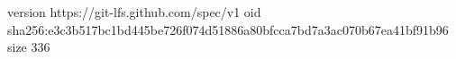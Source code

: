 version https://git-lfs.github.com/spec/v1
oid sha256:e3c3b517bc1bd445be726f074d51886a80bfcca7bd7a3ac070b67ea41bf91b96
size 336
